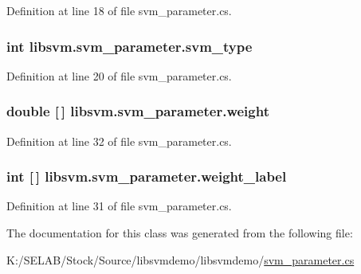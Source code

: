 Definition at line 18 of file svm\_\-parameter.cs.

\hypertarget{classlibsvm_1_1svm__parameter_aad3fe1b0e94af81ddbfc792fa95e619e}{
\subsubsection[{svm\_\-type}]{\setlength{\rightskip}{0pt plus 5cm}int {\bf libsvm.svm\_\-parameter.svm\_\-type}}}
\label{classlibsvm_1_1svm__parameter_aad3fe1b0e94af81ddbfc792fa95e619e}


Definition at line 20 of file svm\_\-parameter.cs.

\hypertarget{classlibsvm_1_1svm__parameter_adc5329dbe9739baaf8c986ed2d8ad9e8}{
\subsubsection[{weight}]{\setlength{\rightskip}{0pt plus 5cm}double \mbox{[}$\,$\mbox{]} {\bf libsvm.svm\_\-parameter.weight}}}
\label{classlibsvm_1_1svm__parameter_adc5329dbe9739baaf8c986ed2d8ad9e8}


Definition at line 32 of file svm\_\-parameter.cs.

\hypertarget{classlibsvm_1_1svm__parameter_a7f5f3a41706f3b77ef713efd8d289dee}{
\subsubsection[{weight\_\-label}]{\setlength{\rightskip}{0pt plus 5cm}int \mbox{[}$\,$\mbox{]} {\bf libsvm.svm\_\-parameter.weight\_\-label}}}
\label{classlibsvm_1_1svm__parameter_a7f5f3a41706f3b77ef713efd8d289dee}


Definition at line 31 of file svm\_\-parameter.cs.



The documentation for this class was generated from the following file:\begin{DoxyCompactItemize}
\item 
K:/SELAB/Stock/Source/libsvmdemo/libsvmdemo/\hyperlink{svm__parameter_8cs}{svm\_\-parameter.cs}\end{DoxyCompactItemize}

